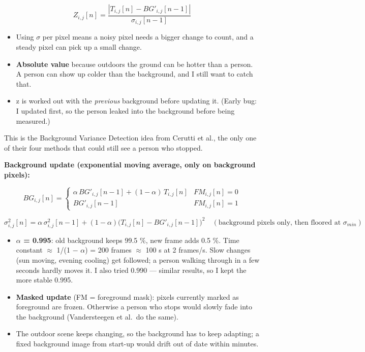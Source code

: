 \documentclass[11pt,a4paper]{article}
\providecommand{\tightlist}{\setlength{\itemsep}{0pt}\setlength{\parskip}{0pt}}
\begin{document}
\[
Z_{i,j}[n] = \frac{|T_{i,j}[n] - BG'_{i,j}[n-1]|}{\sigma_{i,j}[n-1]}
\]

\begin{itemize}
\tightlist
\item
  Using $\sigma$ per pixel means a
  noisy pixel needs a bigger
  change to count, and a
  steady pixel can pick up a
  small change.
\item
  \textbf{Absolute value}
  because outdoors the ground
  can be hotter than a person.
  A person can show up colder
  than the background, and I
  still want to catch that.
\item
  z is worked out with the
  \emph{previous} background
  before updating it. (Early
  bug: I updated first, so the
  person leaked into the
  background before being
  measured.)
\end{itemize}

This is the Background
Variance Detection idea from
Cerutti et al., the only one
of their four methods that
could still see a person who
stopped.

\textbf{Background update
(exponential moving average,
only on background pixels):}

\[
BG_{i,j}[n] = \begin{cases}\alpha\,BG'_{i,j}[n-1] + (1-\alpha)\,T_{i,j}[n] & FM_{i,j}[n]=0\\ BG'_{i,j}[n-1] & FM_{i,j}[n]=1\end{cases}
\]

\[
\sigma^2_{i,j}[n] = \alpha\,\sigma^2_{i,j}[n-1] + (1-\alpha)\big(T_{i,j}[n]-BG'_{i,j}[n-1]\big)^2 \quad (\text{background pixels only, then floored at } \sigma_{min})
\]

\begin{itemize}
\tightlist
\item
  \textbf{$\alpha$ = 0.995}: old
  background keeps 99.5 \%,
  new frame adds 0.5 \%. Time
  constant $\approx$ 1/(1 $-$ $\alpha$) = 200
  frames $\approx$ 100 s at 2
  frames/s. Slow changes (sun
  moving, evening cooling) get
  followed; a person walking
  through in a few seconds
  hardly moves it. I also
  tried 0.990 --- similar
  results, so I kept the more
  stable 0.995.
\item
  \textbf{Masked update} (FM =
  foreground mask): pixels
  currently marked as
  foreground are frozen.
  Otherwise a person who stops
  would slowly fade into the
  background (Vandersteegen et
  al.~do the same).
\item
  The outdoor scene keeps
  changing, so the background
  has to keep adapting; a
  fixed background image from
  start-up would drift out of
  date within minutes.
\end{itemize}
\end{document}
